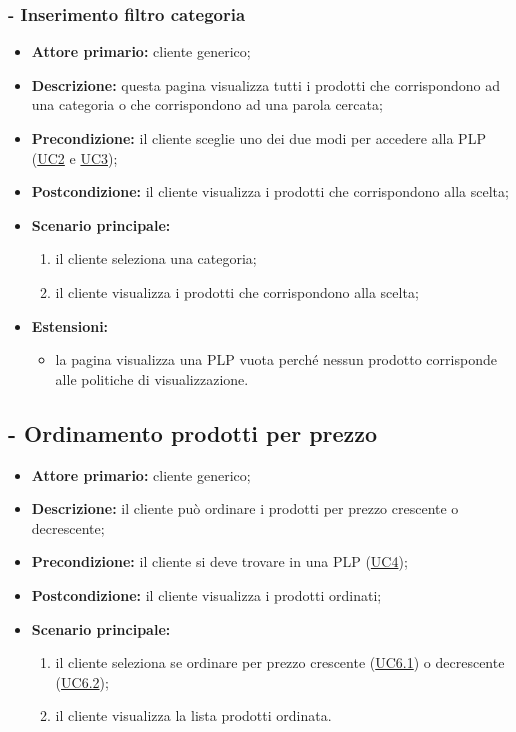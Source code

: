 \subsubsection{ - Inserimento filtro categoria}
\begin{itemize}
    \item \textbf{Attore primario:} cliente generico;
    \item \textbf{Descrizione:} questa pagina visualizza tutti i prodotti che corrispondono ad una categoria o che corrispondono ad una parola cercata;
    \item \textbf{Precondizione:} il cliente sceglie uno dei due modi per accedere alla PLP (\hyperref[UC2]{UC2} e \hyperref[UC3]{UC3});
    \item \textbf{Postcondizione:} il cliente visualizza i prodotti che corrispondono alla scelta;
    \item \textbf{Scenario principale:}
          \begin{enumerate}
              \item il cliente seleziona una categoria;
              \item il cliente visualizza i prodotti che corrispondono alla scelta;
          \end{enumerate}
    \item \textbf{Estensioni:}
          \begin{itemize}
              \item la pagina visualizza una PLP vuota perché nessun prodotto corrisponde alle politiche di visualizzazione.
          \end{itemize}
\end{itemize}

\stepUserCase
\subsection{ - Ordinamento prodotti per prezzo}
\begin{itemize}
    \item \textbf{Attore primario:} cliente generico;
    \item \textbf{Descrizione:} il cliente può ordinare i prodotti per prezzo crescente o decrescente;
    \item \textbf{Precondizione:} il cliente si deve trovare in una PLP (\hyperref[UC4]{UC4});
    \item \textbf{Postcondizione:} il cliente visualizza i prodotti ordinati;
    \item \textbf{Scenario principale:}
          \begin{enumerate}
              \item il cliente seleziona se ordinare per prezzo crescente (\hyperref[UC6.1]{UC6.1}) o decrescente (\hyperref[UC6.2]{UC6.2});
              \item il cliente visualizza la lista prodotti ordinata.
          \end{enumerate}
\end{itemize}

